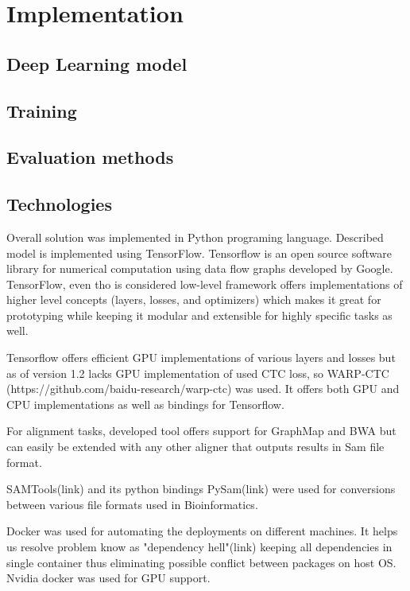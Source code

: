 \documentclass[times, utf8, diplomski, english]{fer}
\begin{document}
\chapter{Implementation}
\section{Deep Learning model}
\section{Training}
\section{Evaluation methods}
\section{Technologies}

Overall solution was implemented in Python programing language. Described model is implemented using TensorFlow. Tensorflow is an open source software library for numerical computation using data flow graphs developed by Google.  TensorFlow, even tho is considered low-level framework offers implementations of higher level concepts (layers, losses, and optimizers) which makes it great for prototyping while keeping it modular and extensible for highly specific tasks as well.

Tensorflow offers efficient GPU implementations of various layers and losses but as of version 1.2 lacks GPU implementation of used CTC loss, so WARP-CTC (https://github.com/baidu-research/warp-ctc) was used. It offers both GPU and CPU implementations as well as bindings for Tensorflow.

For alignment tasks, developed tool offers support for GraphMap and BWA but can easily be extended with any other aligner that outputs results in Sam file format.

SAMTools(link) and its python bindings PySam(link) were used for conversions between various file formats used in Bioinformatics.

Docker was used for automating the deployments on different machines. It helps us resolve problem know as  "dependency hell"(link)  keeping all dependencies in single container thus eliminating possible conflict between packages on host OS.
Nvidia docker was used for GPU support.
\end{document}
